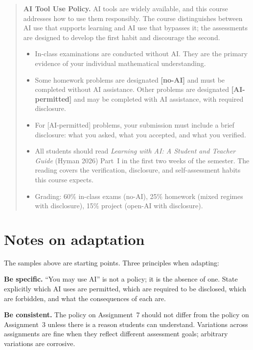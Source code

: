 \documentclass[11pt]{book}
\begin{document}
\begin{quote}
\textbf{AI Tool Use Policy.} AI tools are widely available, and this course addresses how to use them responsibly. The course distinguishes between AI use that supports learning and AI use that bypasses it; the assessments are designed to develop the first habit and discourage the second.

\begin{itemize}\setlength{\itemsep}{2pt}
\item In-class examinations are conducted without AI. They are the primary evidence of your individual mathematical understanding.
\item Some homework problems are designated \textbf{[no-AI]} and must be completed without AI assistance. Other problems are designated \textbf{[AI-permitted]} and may be completed with AI assistance, with required disclosure.
\item For [AI-permitted] problems, your submission must include a brief disclosure: what you asked, what you accepted, and what you verified.
\item All students should read \emph{Learning with AI: A Student and Teacher Guide} (Hyman 2026) Part~I in the first two weeks of the semester. The reading covers the verification, disclosure, and self-assessment habits this course expects.
\item Grading: 60\% in-class exams (no-AI), 25\% homework (mixed regimes with disclosure), 15\% project (open-AI with disclosure).
\end{itemize}
\end{quote}

\section*{Notes on adaptation}

The samples above are starting points. Three principles when adapting:

\textbf{Be specific.} ``You may use AI'' is not a policy; it is the absence of one. State explicitly which AI uses are permitted, which are required to be disclosed, which are forbidden, and what the consequences of each are.

\textbf{Be consistent.} The policy on Assignment~7 should not differ from the policy on Assignment~3 unless there is a reason students can understand. Variations across assignments are fine when they reflect different assessment goals; arbitrary variations are corrosive.
\end{document}

